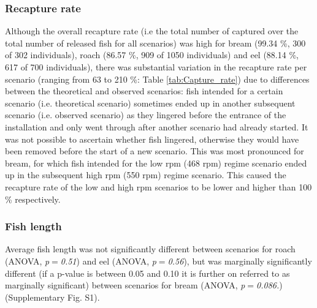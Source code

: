 \documentclass[fleqn,10pt]{wlscirep}
\begin{document}
\subsubsection*{Recapture rate}
Although the overall recapture rate (i.e the total number of captured over the total number of released fish for all scenarios) was high for bream (99.34 \%, 300 of 302 individuals), roach (86.57 \%, 909 of 1050 individuals) and eel (88.14 \%, 617 of 700 individuals), there was substantial variation in the recapture rate per scenario (ranging from 63 to 210 \%: Table \ref{tab:Capture_rate}) due to differences between the theoretical and observed scenarios: fish intended for a certain scenario (i.e. theoretical scenario) sometimes ended up in another subsequent scenario (i.e. observed scenario) as they lingered before the entrance of the installation and only went through after another scenario had already started. It was not possible to ascertain whether fish lingered, otherwise they would have been removed before the start of a new scenario. This was most pronounced for bream, for which fish intended for the low rpm (468 rpm) regime scenario ended up in the subsequent high rpm (550 rpm) regime scenario. This caused the recapture rate of the low and high rpm scenarios to be lower and higher than 100 \% respectively.  

\subsubsection*{Fish length}
Average fish length was not significantly different between scenarios for roach (ANOVA, \textit{p$=$0.51}) and eel (ANOVA, \textit{p$=$0.56}), but was marginally significantly different (if a p-value is between 0.05 and 0.10 it is further on referred to as marginally significant) between scenarios for bream (ANOVA, \textit{p$=$0.086.}) (Supplementary Fig. S1).
\end{document}

